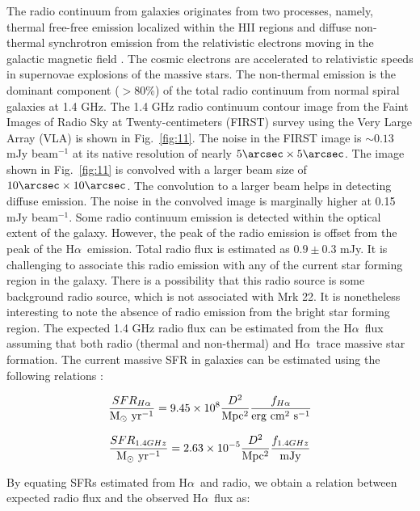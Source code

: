 \documentclass[useAMS,usenatbib]{mn2e}
\def\Ha{H$\alpha$~}
\begin{document}
The radio continuum from galaxies originates from two processes, namely, thermal free-free emission localized within the H{\small{II}} regions and diffuse non-thermal synchrotron emission from the relativistic electrons moving in the galactic magnetic field \citep{1992ARA&A..30..575C}. The cosmic electrons are accelerated to relativistic speeds in supernovae explosions of the massive stars. The non-thermal emission is the dominant component ($>80$\%) of the total radio continuum from normal spiral galaxies at 1.4 GHz. The 1.4 GHz radio continuum contour image from the Faint Images of Radio Sky at Twenty-centimeters (FIRST) survey using the Very Large Array (VLA) is shown in Fig.~\ref{fig:11}. The noise in the FIRST image is $\sim0.13$ mJy beam$^{-1}$ at its native resolution of nearly $5\arcsec \times 5\arcsec$. The image shown in Fig.~\ref{fig:11} is convolved with a larger beam size of $10\arcsec \times 10\arcsec$. The convolution to a larger beam helps in detecting diffuse emission. The noise in the convolved image is marginally higher at 0.15 mJy beam$^{-1}$. Some radio continuum emission is detected within the optical extent of the galaxy. However, the peak of the radio emission is offset from the peak of the \Ha emission. Total radio flux is estimated as $0.9\pm0.3$ mJy. It is challenging to associate this radio emission with any of the current star forming region in the galaxy. There is a possibility that this radio source is some background radio source, which is not associated with Mrk 22. It is nonetheless interesting to note the absence of radio emission from the bright star forming region. The expected 1.4 GHz radio flux can be estimated from the \Ha flux assuming that both radio (thermal and non-thermal) and \Ha trace massive star formation. The current massive SFR in galaxies can be estimated using the following relations \citep[cf.,][]{1998ApJ...498..541K,2002AJ....124..675C}: 

\begin{equation}
\frac{SFR_{H\alpha}}{\rm M_\odot~yr^{-1}} = 9.45\times10^{8} \frac{D^{2}}{\rm Mpc^{2}} \frac{f_{H\alpha}}{\rm erg~cm^{2}~s^{-1}}
\end{equation}

\begin{equation}
\frac{SFR_{1.4 GHz}}{\rm M_\odot~yr^{-1}} = 2.63\times10^{-5} \frac{D^{2}}{\rm Mpc^{2}} \frac{f_{1.4 GHz}}{\rm mJy}
\end{equation}

By equating SFRs estimated from \Ha and radio, we obtain a relation between expected radio flux and the observed \Ha flux as: 
\end{document}
